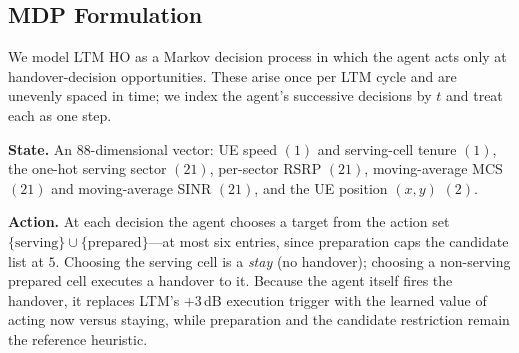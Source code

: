 \documentclass[conference]{IEEEtran}
\begin{document}
\subsection{MDP Formulation}
\label{sec:mdp}
We model LTM HO as a Markov decision process in which the agent acts only at
handover-decision opportunities. These arise once per LTM cycle and are
unevenly spaced in time; we index the agent's successive decisions by $t$ and
treat each as one step.

\textbf{State.} An $88$-dimensional vector: UE speed $(1)$ and serving-cell
tenure $(1)$, the one-hot serving sector $(21)$, per-sector RSRP $(21)$,
moving-average MCS $(21)$ and moving-average SINR $(21)$, and the UE position
$(x,y)$ $(2)$.

\textbf{Action.} At each decision the agent chooses a target from the action set
$\{\text{serving}\}\cup\{\text{prepared}\}$---at most six entries, since
preparation caps the candidate list at $5$. Choosing the serving cell is a
\emph{stay} (no handover); choosing a non-serving prepared cell executes a
handover to it. Because the agent itself fires the handover, it replaces LTM's
$+3$\,dB execution trigger with the learned value of acting now versus staying,
while preparation and the candidate restriction remain the reference heuristic.
\end{document}
